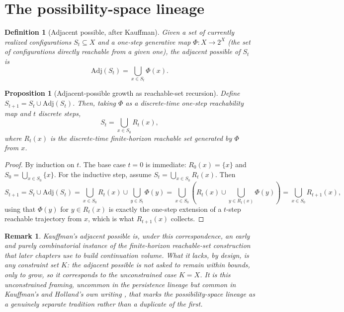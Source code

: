 \documentclass[11pt]{report}
\newtheorem{proposition}{Proposition}[chapter]
\newtheorem{definition}{Definition}[chapter]
\newtheorem{remark}{Remark}[chapter]
\begin{document}
\section*{The possibility-space lineage}

\begin{definition}[Adjacent possible, after Kauffman]
Given a set of currently realized configurations $S_t \subseteq X$ and a
one-step generative map $\Phi : X \to 2^X$ (the set of configurations
directly reachable from a given one), the adjacent possible of $S_t$ is
\[
\mathrm{Adj}(S_t) = \bigcup_{x \in S_t} \Phi(x).
\]
\end{definition}

\begin{proposition}[Adjacent-possible growth as reachable-set recursion]
Define $S_{t+1} = S_t \cup \mathrm{Adj}(S_t)$. Then, taking
$\Phi$ as a discrete-time one-step reachability map and $t$ discrete
steps,
\[
S_t = \bigcup_{x \in S_0} R_t(x),
\]
where $R_t(x)$ is the discrete-time finite-horizon reachable set
generated by $\Phi$ from $x$.
\end{proposition}
\begin{proof}
By induction on $t$. The base case $t=0$ is immediate:
$R_0(x) = \{x\}$ and $S_0 = \bigcup_{x \in S_0} \{x\}$. For the
inductive step, assume $S_t = \bigcup_{x \in S_0} R_t(x)$. Then
\[
S_{t+1} = S_t \cup \mathrm{Adj}(S_t) = \bigcup_{x \in S_0} R_t(x) \cup \bigcup_{y \in S_t} \Phi(y) = \bigcup_{x \in S_0} \left( R_t(x) \cup \bigcup_{y \in R_t(x)} \Phi(y) \right) = \bigcup_{x \in S_0} R_{t+1}(x),
\]
using that $\Phi(y)$ for $y \in R_t(x)$ is exactly the one-step
extension of a $t$-step reachable trajectory from $x$, which is what
$R_{t+1}(x)$ collects.
\end{proof}

\begin{remark}
Kauffman's adjacent possible \cite{kauffman2000} is, under this
correspondence, an early and purely combinatorial instance of the
finite-horizon reachable-set construction that later chapters use to
build continuation volume. What it lacks, by design, is any constraint
set $K$: the adjacent possible is not asked to remain within bounds,
only to grow, so it corresponds to the unconstrained case $K = X$. It is
this unconstrained framing, uncommon in the persistence lineage but
common in Kauffman's and Holland's own writing \cite{holland1995}, that
marks the possibility-space lineage as a genuinely separate tradition
rather than a duplicate of the first.
\end{remark}
\end{document}
